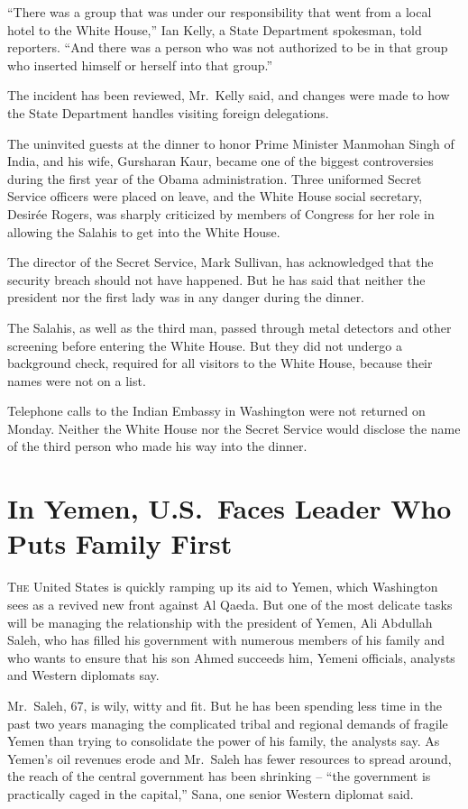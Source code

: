 ﻿\documentclass[12pt]{article}
\begin{document}
``There was a group that was under our responsibility that went from a local hotel to the White
House,'' Ian Kelly, a State Department spokesman, told reporters. ``And there was a person who was
not authorized to be in that group who inserted himself or herself into that group.''

The incident has been reviewed, Mr.~Kelly said, and changes were made to how the State Department
handles visiting foreign delegations.

The uninvited guests at the dinner to honor Prime Minister Manmohan Singh of India, and his wife,
Gursharan Kaur, became one of the biggest controversies during the first year of the Obama
administration. Three uniformed Secret Service officers were placed on leave, and the White House
social secretary, Desir\'ee Rogers, was sharply criticized by members of Congress for her role in
allowing the Salahis to get into the White House.

The director of the Secret Service, Mark Sullivan, has acknowledged that the security breach should
not have happened. But he has said that neither the president nor the first lady was in any danger
during the dinner.

The Salahis, as well as the third man, passed through metal detectors and other screening before
entering the White House. But they did not undergo a background check, required for all visitors to
the White House, because their names were not on a list.

Telephone calls to the Indian Embassy in Washington were not returned on Monday. Neither the White
House nor the Secret Service would disclose the name of the third person who made his way into the
dinner.

\section{In Yemen, U.S.~Faces Leader Who Puts Family First}

\lettrine{T}{he} United States is quickly ramping up its aid to Yemen, which
Washington sees as a revived new front against Al Qaeda. But one of the most delicate tasks will be
managing the relationship with the president of Yemen, Ali Abdullah Saleh, who has filled his
government with numerous members of his family and who wants to ensure that his son Ahmed succeeds
him, Yemeni officials, analysts and Western diplomats say.

Mr.~Saleh, 67, is wily, witty and fit. But he has been spending less time in the past two years
managing the complicated tribal and regional demands of fragile Yemen than trying to consolidate the
power of his family, the analysts say. As Yemen's oil revenues erode and Mr.~Saleh has fewer
resources to spread around, the reach of the central government has been shrinking -- ``the
government is practically caged in the capital,'' Sana, one senior Western diplomat said.
\end{document}
